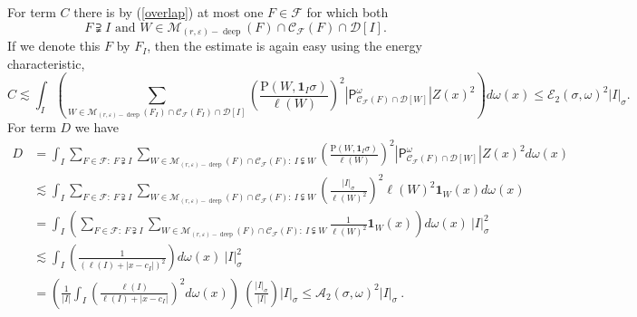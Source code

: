 \documentclass{amsart}%
\theoremstyle{plain}
\numberwithin{equation}{section}
\begin{document}
For term $C$ there is by (\ref{overlap}) at most one $F\in\mathcal{F}$ for
which both
\[
F\supsetneqq I\text{ and }W\in\mathcal{M}_{\left(  r,\varepsilon\right)
-\operatorname*{deep}}\left(  F\right)  \cap\mathcal{C}_{\mathcal{F}}\left(
F\right)  \cap\mathcal{D}\left[  I\right]  .
\]
If we denote this $F$ by $F_{I}$, then the estimate is again easy using the
energy characteristic,%
\[
C\lesssim\int_{I}\left(  \sum_{W\in\mathcal{M}_{\left(  r,\varepsilon\right)
-\operatorname*{deep}}\left(  F_{I}\right)  \cap\mathcal{C}_{\mathcal{F}%
}\left(  F_{I}\right)  \cap\mathcal{D}\left[  I\right]  }\left(
\frac{\mathrm{P}\left(  W,\mathbf{1}_{I}\sigma\right)  }{\ell\left(  W\right)
}\right)  ^{2}\left\vert \mathsf{P}_{\mathcal{C}_{\mathcal{F}}\left(
F\right)  \cap\mathcal{D}\left[  W\right]  }^{\omega}\right\vert Z\left(
x\right)  ^{2}\right)  d\omega\left(  x\right)  \leq\mathcal{E}_{2}\left(
\sigma,\omega\right)  ^{2}\left\vert I\right\vert _{\sigma}.
\]
For term $D$ we have%
\begin{align*}
D  & =\int_{I}\sum_{F\in\mathcal{F}:\ F\supsetneqq I}\sum_{W\in\mathcal{M}%
_{\left(  r,\varepsilon\right)  -\operatorname*{deep}}\left(  F\right)
\cap\mathcal{C}_{\mathcal{F}}\left(  F\right)  :\ I\subsetneqq W}\left(
\frac{\mathrm{P}\left(  W,\mathbf{1}_{I}\sigma\right)  }{\ell\left(  W\right)
}\right)  ^{2}\left\vert \mathsf{P}_{\mathcal{C}_{\mathcal{F}}\left(
F\right)  \cap\mathcal{D}\left[  W\right]  }^{\omega}\right\vert Z\left(
x\right)  ^{2}d\omega\left(  x\right)  \\
& \lesssim\int_{I}\sum_{F\in\mathcal{F}:\ F\supsetneqq I}\sum_{W\in
\mathcal{M}_{\left(  r,\varepsilon\right)  -\operatorname*{deep}}\left(
F\right)  \cap\mathcal{C}_{\mathcal{F}}\left(  F\right)  :\ I\subsetneqq
W}\left(  \frac{\left\vert I\right\vert _{\sigma}}{\ell\left(  W\right)  ^{2}%
}\right)  ^{2}\ell\left(  W\right)  ^{2}\mathbf{1}_{W}\left(  x\right)
d\omega\left(  x\right)  \\
& =\int_{I}\left(  \sum_{F\in\mathcal{F}:\ F\supsetneqq I}\sum_{W\in
\mathcal{M}_{\left(  r,\varepsilon\right)  -\operatorname*{deep}}\left(
F\right)  \cap\mathcal{C}_{\mathcal{F}}\left(  F\right)  :\ I\subsetneqq
W}\frac{1}{\ell\left(  W\right)  ^{2}}\mathbf{1}_{W}\left(  x\right)  \right)
d\omega\left(  x\right)  \ \left\vert I\right\vert _{\sigma}^{2}\\
& \lesssim\int_{I}\left(  \frac{1}{\left(  \ell\left(  I\right)  +\left\vert
x-c_{I}\right\vert \right)  ^{2}}\right)  d\omega\left(  x\right)
\ \left\vert I\right\vert _{\sigma}^{2}\\
& =\left(  \frac{1}{\left\vert I\right\vert }\int_{I}\left(  \frac{\ell\left(
I\right)  }{\ell\left(  I\right)  +\left\vert x-c_{I}\right\vert }\right)
^{2}d\omega\left(  x\right)  \right)  \ \left(  \frac{\left\vert I\right\vert
_{\sigma}}{\left\vert I\right\vert }\right)  \left\vert I\right\vert _{\sigma
}\leq\mathcal{A}_{2}\left(  \sigma,\omega\right)  ^{2}\left\vert I\right\vert
_{\sigma}\ .
\end{align*}
\end{document}
